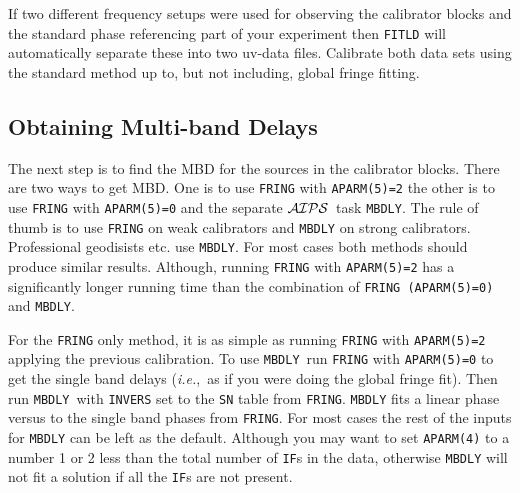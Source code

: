 \documentclass[preprint]{aastex}
\newcommand{\AIPS}{{$\cal AIPS\/$}}
\newcommand{\ie}{{\it i.e.},}
\begin{document}
If two different frequency setups were used for observing the calibrator blocks
and the standard phase referencing part of your experiment then {\tt FITLD} will
automatically separate these into two uv-data files.  Calibrate both data sets
using the standard method up to, but not including, global fringe fitting.

\subsection{Obtaining Multi-band Delays}

The next step is to find the MBD for the sources in the calibrator blocks.
There are two ways to get MBD.  One is to use {\tt FRING} with
{\tt APARM(5)=2}
the other is to use {\tt FRING} with {\tt APARM(5)=0} and the separate \AIPS\ task
{\tt MBDLY}\@.
The rule of thumb is to use {\tt FRING} on weak calibrators and {\tt MBDLY} on strong
calibrators.  Professional geodisists etc. use {\tt MBDLY}\@.  For most cases both
methods should produce similar results.  Although, running {\tt FRING} with
{\tt APARM(5)=2} has a significantly longer running time than the combination
of {\tt FRING (APARM(5)=0)} and {\tt MBDLY}.

For the {\tt FRING} only method, it is as simple as running {\tt FRING} with
{\tt APARM(5)=2}\,
applying the previous calibration.  To use {\tt MBDLY}\, run {\tt FRING} with {\tt APARM(5)=0} to get
the single band delays (\ie\ as if you were doing the global fringe fit).  Then run {\tt MBDLY}\,
with {\tt INVERS} set to the {\tt SN} table from {\tt FRING}\@.
{\tt MBDLY} fits a linear phase versus to the single band phases from {\tt FRING}\@.
For most cases the rest of
the inputs for {\tt MBDLY} can be left as the default.  Although you may want to set {\tt APARM(4)}
to a number 1 or 2 less than the total number of {\tt IF}s in the data, otherwise {\tt MBDLY}
will not fit a solution if all the {\tt IF}s are not present.
\end{document}
